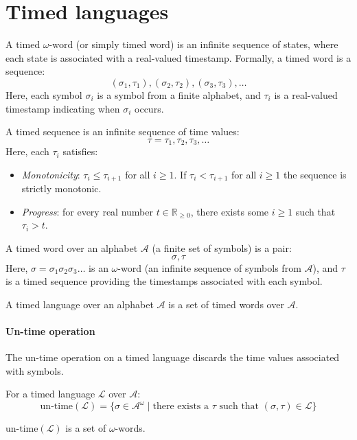 \section{Timed languages}

A timed $\omega$-word (or simply timed word) is an infinite sequence of states, where each state is associated with a real-valued timestamp.
Formally, a timed word is a sequence:
\[(\sigma_1,\tau_1),(\sigma_2,\tau_2),(\sigma_3,\tau_3),\dots\]
Here, each symbol $\sigma_i$ is a symbol from a finite alphabet, and $\tau_i$ is a real-valued timestamp indicating when $\sigma_i$ occurs.
\begin{definition}
    A timed sequence is an infinite sequence of time values:
    \[\tau=\tau_1,\tau_2,\tau_3,\dots\]
    Here, each $\tau_i$ satisfies: 
    \begin{itemize}
        \item \textit{Monotonicity}: $\tau_i\leq\tau_{i+1}$ for all $i\geq 1$. 
            If $\tau_i<\tau_{i+1}$ for all $i\geq 1$ the sequence is strictly monotonic.
        \item \textit{Progress}: for every real number $t\in\mathbb{R}_{\geq 0}$, there exists some $i\geq 1$ such that $\tau_i> t$. 
    \end{itemize}
\end{definition}
\begin{definition}
    A timed word over an alphabet $\mathcal{A}$ (a finite set of symbols) is a pair:
    \[\sigma,\tau\]
    Here, $\sigma=\sigma_1\sigma_2\sigma_3\dots$ is an $\omega$-word (an infinite sequence of symbols from $\mathcal{A}$), and $\tau$ is a timed sequence providing the timestamps associated with each symbol.
\end{definition}
\begin{definition}
    A timed language over an alphabet $\mathcal{A}$ is a set of timed words over $\mathcal{A}$.
\end{definition}

\paragraph*{Un-time operation}
The un-time operation on a timed language discards the time values associated with symbols.

\begin{definition}
    For a timed language $\mathcal{L}$ over $\mathcal{A}$:
    \[\text{un-time}(\mathcal{L}) = \{ \sigma \in \mathcal{A}^\omega \mid \text{there exists a } \tau \text{ such that } (\sigma, \tau) \in \mathcal{L} \}\]
\end{definition}
\noindent $\text{un-time}(\mathcal{L})$ is a set of $\omega$-words.

